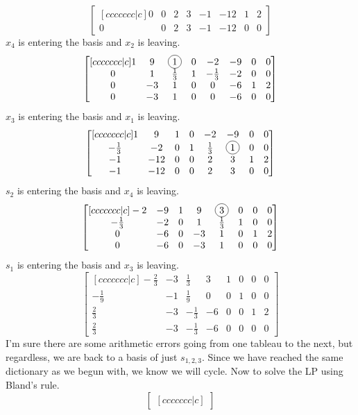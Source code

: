 \documentclass[12pt]{article}
\newcommand*\circled[1]{\tikz[baseline=(char.base)]{
		\node[shape=circle,draw,inner sep=2pt] (char) {#1};}}
\newenvironment{exercise}[2][Exercise]{\begin{trivlist}
		\item[\hskip \labelsep {\bfseries #1}\hskip \labelsep {\bfseries #2.}]}{\end{trivlist}}
\begin{document}
\begin{exercise}{4}
\[\begin{bmatrix}[ccccccc|c]
		 0 &  0 &     2        &   3 & -1			  & -12 &  1 & 2\\
	 	 0 &  0 &     2        &   3 & -1 			  & -12 &  0 & 0
\end{bmatrix}\]
$x_4$ is entering the basis and $x_2$ is leaving.
\[\begin{bmatrix}[ccccccc|c]
	 1 &  9 & \circled{1}  &  0 &  -2           &  -9 &  0 & 0\\
	 0 &  1 & \frac{1}{3}  &  1 &  -\frac{1}{3} &  -2 &  0 & 0\\
	 0 & -3 &     1        &  0 &  0			 &  -6 &  1 & 2\\
	 0 & -3 &     1        &  0 &  0 			 &  -6 &  0 & 0
\end{bmatrix}\]
$x_3$ is entering the basis and $x_1$ is leaving.
\[\begin{bmatrix}[ccccccc|c]
	 1 			  &   9 & 1 &  0 &  -2          &  -9 &  0 & 0\\
	 -\frac{1}{3} &  -2 & 0 &  1 &  \frac{1}{3} &   \circled{1} &  0 & 0\\
	-1 			  & -12 & 0 &  0 &  2		    &   3 &  1 & 2\\
	-1 			  & -12 & 0 &  0 &  2 			&   3 &  0 & 0
\end{bmatrix}\]
$s_2$ is entering the basis and $x_4$ is leaving.
\[\begin{bmatrix}[ccccccc|c]
	-2 			  & -9 & 1 &  9 &  \circled{3} &  0 &  0 & 0\\
	-\frac{1}{3}  & -2 & 0 &  1 &  \frac{1}{3} &  1 &  0 & 0\\
	0 			  & -6 & 0 & -3 &  1		   &  0 &  1 & 2\\
	0 			  & -6 & 0 & -3 &  1 		   &  0 &  0 & 0
\end{bmatrix}\]
$s_1$ is entering the basis and $x_3$ is leaving.
\[\begin{bmatrix}[ccccccc|c]
	-\frac{2}{3} & -3 & \frac{1}{3} &  3 &  1 &  0 &  0 & 0\\
	-\frac{1}{9} & -1 & \frac{1}{9} &  0 & 0 &  1 &  0 & 0\\
	\frac{2}{3}  & -3 & -\frac{1}{3}& -6 &  0 &  0 &  1 & 2\\
	\frac{2}{3}  & -3 & -\frac{1}{3}& -6 &  0 &  0 &  0 & 0
\end{bmatrix}\]
I'm sure there are some arithmetic errors going from one tableau to the next, but regardless, we are back to a basis of just $s_{1,2,3}$. Since we have reached the same dictionary as we begun with, we know we will cycle. Now to solve the LP using Bland's rule.
\[\begin{bmatrix}[ccccccc|c]

\end{bmatrix}\]
\end{exercise}
\end{document}

